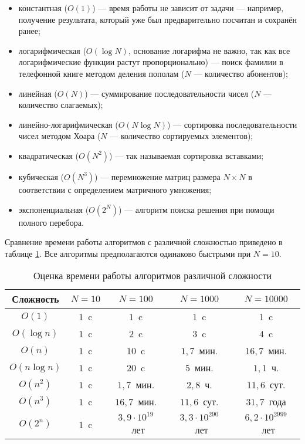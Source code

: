 \begin{itemize}
\item константная ($O(1)$) — время работы не зависит от задачи —
  например, получение результата, который уже был предварительно
  посчитан и сохранён ранее;
\item логарифмическая ($O(\log N)$, основание логарифма не важно, так
  как все логарифмические функции растут пропорционально) — поиск
  фамилии в телефонной книге методом деления пополам ($N$ — количество
  абонентов);
\item линейная ($O(N)$) — суммирование последовательности чисел ($N$ —
  количество слагаемых);
\item линейно-логарифмическая ($O(N\log N)$) — сортировка
  последовательности чисел методом Хоара ($N$ — количество сортируемых
  элементов);
\item квадратическая ($O(N^{2})$) — так называемая сортировка вставками;
\item кубическая ($O(N^{3})$) — перемножение матриц размера $N\times
  N$ в соответствии с определением матричного умножения;
\item экспоненциальная ($O(2^{N})$) — алгоритм поиска решения при
  помощи полного перебора.
\end{itemize}

Сравнение времени работы алгоритмов с различной сложностью приведено в
таблице \ref{tbl:complexity}. Все алгоритмы предполагаются одинаково
быстрыми при $N=10$.

\begin{table}
  \begin{centering}
    \begin{tabular}{|c|c|c|c|c|}
      \hline 
      Сложность    & $N=10$ & $N=100$                 & $N=1000$                 & $N=10000$\\
      \hline 
      \hline 
      $O(1)$       & $1$~c  & $1$~c                   & $1$~c                    & $1$~c\\
      \hline 
      $O(\log n)$  & $1$~c  & $2$~c                   & $3$~c                    & $4$~c\\
      \hline 
      $O(n)$       & $1$~c  & $10$~c                  & $1{,}7$~мин.             & $16{,}7$~мин.\\
      \hline 
      $O(n\log n)$ & $1$~c  & $20$~c                  & $5$~мин.                 & $1{,}1$~ч.\\
      \hline 
      $O(n^{2})$   & $1$~c  & $1{,}7$~мин.            & $2{,}8$~ч.               & $11{,}6$~сут.\\
      \hline 
      $O(n^{3})$   & $1$~c  & $16{,}7$~мин.           & $11{,}6$~сут.            & $31{,}7$~года\\
      \hline 
      $O(2^{n})$   & $1$~c  & $3{,}9\cdot10^{19}$~лет & $3{,}3\cdot10^{290}$~лет & $6{,}2\cdot10^{2999}$~лет\\
      \hline 
    \end{tabular}
    \par
  \end{centering}
    
  \caption{Оценка времени работы алгоритмов различной сложности}
  \label{tbl:complexity}
\end{table}

